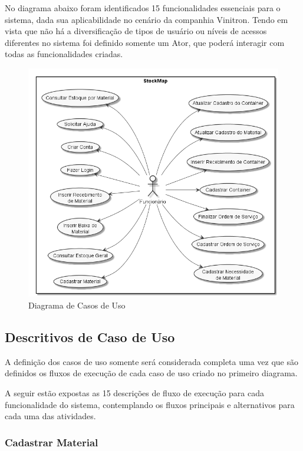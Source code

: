 \documentclass[rascunho,xindy,acronym,symbols]{fei}
\begin{document}
No diagrama abaixo foram identificados 15 funcionalidades essenciais para o sistema, dada sua aplicabilidade no cenário da companhia Vinitron. Tendo em vista que não há a diversificação de tipos de usuário ou níveis de acessos diferentes no sistema foi definido somente um Ator, que poderá interagir com todas as funcionalidades criadas.

\begin{figure}[h]
    \centering
    \includegraphics[width=\textwidth]{./Images/Casos_de_Uso.png}
    \caption{Diagrama de Casos de Uso}
    \label{fig:diag_caso_uso}
\end{figure}

\subsection{Descritivos de Caso de Uso}

A definição dos casos de uso somente será considerada completa uma vez que são definidos os fluxos de execução de cada caso de uso criado no primeiro diagrama.

A seguir estão expostas as 15 descrições de fluxo de execução para cada funcionalidade do sistema, contemplando os fluxos principais e alternativos para cada uma das atividades.

\subsubsection{Cadastrar Material}
\end{document}

